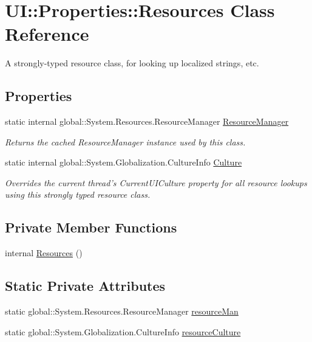 \hypertarget{class_u_i_1_1_properties_1_1_resources}{
\section{UI::Properties::Resources Class Reference}
\label{class_u_i_1_1_properties_1_1_resources}
}


A strongly-\/typed resource class, for looking up localized strings, etc.  
\subsection*{Properties}
\begin{DoxyCompactItemize}
\item 
static internal global::System.Resources.ResourceManager \hyperlink{class_u_i_1_1_properties_1_1_resources_a8766fbe41ebf10ebf9984cbe9e4ad7f9}{ResourceManager}
\begin{DoxyCompactList}\small\item\em Returns the cached ResourceManager instance used by this class. \item\end{DoxyCompactList}\item 
static internal global::System.Globalization.CultureInfo \hyperlink{class_u_i_1_1_properties_1_1_resources_a46a0e9bbbbdb0717d4a25428483b2728}{Culture}
\begin{DoxyCompactList}\small\item\em Overrides the current thread's CurrentUICulture property for all resource lookups using this strongly typed resource class. \item\end{DoxyCompactList}\end{DoxyCompactItemize}
\subsection*{Private Member Functions}
\begin{DoxyCompactItemize}
\item 
internal \hyperlink{class_u_i_1_1_properties_1_1_resources_aa31711d7a6220001343ebf336c8234d9}{Resources} ()
\end{DoxyCompactItemize}
\subsection*{Static Private Attributes}
\begin{DoxyCompactItemize}
\item 
static global::System.Resources.ResourceManager \hyperlink{class_u_i_1_1_properties_1_1_resources_a4d67fb5a56b27ed527034330f5614de9}{resourceMan}
\item 
static global::System.Globalization.CultureInfo \hyperlink{class_u_i_1_1_properties_1_1_resources_a25149ec96c68564c38c6537b958f98bc}{resourceCulture}
\end{DoxyCompactItemize}


